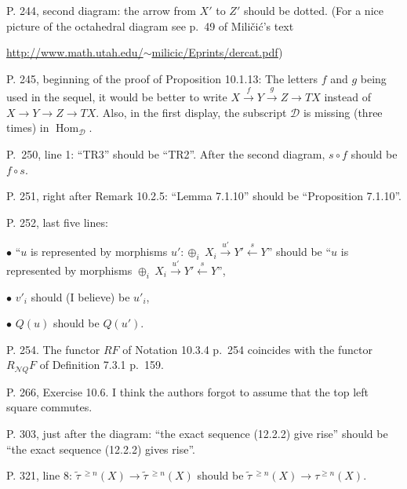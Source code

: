 \documentclass[12pt]{article}
\theoremstyle{remark}
\theoremstyle{definition}
\newcommand{\bu}{\bullet}
\newcommand{\cc}{\mathcal}
\newcommand{\C}{\mathcal C}
\newcommand{\xr}{\xrightarrow}
\DeclareMathOperator{\Hom}{Hom}%
\begin{document}
\noindent P. 244, second diagram: the arrow from $X'$ to $Z'$ should be dotted. (For a nice picture of the octahedral diagram see p.~49 of Mili\v{c}i\'c's text 

\href{http://www.math.utah.edu/~milicic/Eprints/dercat.pdf}{http://www.math.utah.edu/$\sim$milicic/Eprints/dercat.pdf})

\noindent P. 245, beginning of the proof of Proposition 10.1.13: The letters $f$ and $g$ being used in the sequel, it would be better to write $X\xr fY\xr gZ\to TX$ instead of $X\to Y\to Z\to TX$. Also, in the first display, the subscript $\cc D$ is missing (three times) in $\Hom_{\cc D}$.

\noindent P.~250, line 1: ``TR3'' should be ``TR2''. After the second diagram, $s\circ f$ should be $f\circ s$.

\noindent P. 251, right after Remark 10.2.5: ``Lemma 7.1.10'' should be ``Proposition 7.1.10''.

\noindent P. 252, last five lines:

$\bu$ ``$u$ is represented by morphisms $u':\oplus_i\ X_i\xr{u'}Y'\xleftarrow sY$'' should be ``$u$ is represented by morphisms $\oplus_i\ X_i\xr{u'}Y'\xleftarrow sY$'', 

$\bu$ $v'_i$ should (I believe) be $u'_i$, 


$\bu$ $Q(u)$ should be $Q(u')$. 

\noindent P. 254. The functor $RF$ of Notation 10.3.4 p.~254 coincides with the functor $R_{\cc NQ}F$ of Definition 7.3.1 p.~159.

\noindent P. 266, Exercise 10.6. I think the authors forgot to assume that the top left square commutes.


\noindent P. 303, just after the diagram: ``the exact sequence (12.2.2) give rise'' should be ``the exact sequence (12.2.2) gives rise''.

\noindent P. 321, line 8: $\widetilde\tau\,{}^{\ge n}(X)\to\widetilde\tau\,{}^{\ge n}(X)$ should be $\widetilde\tau\,{}^{\ge n}(X)\to\tau^{\ge n}(X)$.

\end{document}
